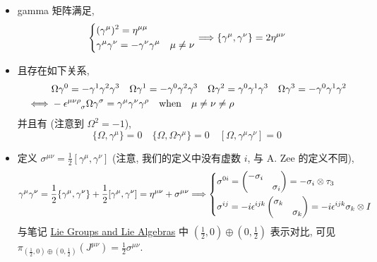 \begin{itemize}
	\noindent\rule[0.5ex]{\linewidth}{0.5pt} %
	
	\item gamma 矩阵满足,
	\begin{equation}
		\begin{dcases}
			(\gamma^\mu)^2 = \eta^{\mu \mu} \\
			\gamma^\mu \gamma^\nu = - \gamma^\nu \gamma^\mu & \mu \neq \nu
		\end{dcases} \Longrightarrow \{\gamma^\mu, \gamma^\nu\} = 2 \eta^{\mu \nu}
	\end{equation}
	
	\item 且存在如下关系,
	\begin{align}
		& \Omega \gamma^0 = - \gamma^1 \gamma^2 \gamma^3 \quad \Omega \gamma^1 = - \gamma^0 \gamma^2 \gamma^3 \quad \Omega \gamma^2 = \gamma^0 \gamma^1 \gamma^3 \quad \Omega \gamma^3 = - \gamma^0 \gamma^1 \gamma^2 \notag \\
		\iff & - \tensor{\epsilon}{^{\mu \nu \rho}_\sigma} \Omega \gamma^\sigma = \gamma^\mu \gamma^\nu \gamma^\rho \quad \text{when} \quad \mu \neq \nu \neq \rho
	\end{align}
	并且有 (注意到 $\Omega^2 = - 1$),
	\begin{equation}
		\{\Omega, \gamma^\mu\} = 0 \quad \{\Omega, \Omega \gamma^\mu\} = 0 \quad [\Omega, \gamma^\mu \gamma^\nu] = 0
	\end{equation}
	
	\noindent\hdashrule[0.5ex]{\linewidth}{0.5pt}{1mm} %
	
	\item 定义 $\sigma^{\mu \nu} = \frac{1}{2} [\gamma^\mu, \gamma^\nu]$ (注意, 我们的定义中没有虚数 $i$, 与 A. Zee 的定义不同),
	\begin{equation}
		\gamma^\mu \gamma^\nu = \frac{1}{2} \{\gamma^\mu, \gamma^\nu\} + \frac{1}{2} [\gamma^\mu, \gamma^\nu] = \eta^{\mu \nu} + \sigma^{\mu \nu} \Longrightarrow \begin{dcases}
			\sigma^{0 i} = \begin{pmatrix}
				- \sigma_i & \\
				& \sigma_i
			\end{pmatrix} = - \sigma_i \otimes \tau_3 \\
			\sigma^{i j} = - i \epsilon^{i j k} \begin{pmatrix}
				\sigma_k & \\
				& \sigma_k
			\end{pmatrix} = - i \epsilon^{i j k} \sigma_k \otimes I
		\end{dcases}
	\end{equation}
	与笔记 \href{https://github.com/siyang03/my-note---Lie-Groups-and-Lie-Algebras}{Lie Groups and Lie Algebras} 中 $(\frac{1}{2}, 0) \oplus (0, \frac{1}{2})$ 表示对比, 可见 $\pi_{(\frac{1}{2}, 0) \oplus (0, \frac{1}{2})}(J^{\mu \nu}) = \frac{1}{2} \sigma^{\mu \nu}$.
\end{itemize}

